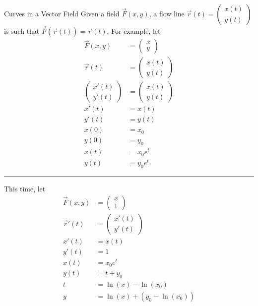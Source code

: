 \documentclass[8pt]{extarticle}
\begin{document}
  \begin{problem}{Curves in a Vector Field}
    Given a field $\vec{F}(x,y)$, a flow line $\vec{r}(t) = \begin{pmatrix}x(t)\\y(t)\end{pmatrix}$ is such that $\vec{F}(\vec{r}(t)) = \vec{r}(t)$. For example, let
    \begin{align*}
      \vec{F}(x,y) &= \begin{pmatrix}x\\y\end{pmatrix}\\
      \vec{r}(t) &= \begin{pmatrix}x(t)\\y(t)\end{pmatrix}\\
      \begin{pmatrix}x'(t) \\ y'(t)\end{pmatrix} &= \begin{pmatrix}x(t)\\y(t)\end{pmatrix}\\
      x'(t) &= x(t)\\
      y'(t) &= y(t)\\
      x(0) &= x_0\\
      y(0) &= y_0\\
      x(t) &= x_0e^{t}\\
      y(t) &= y_0e^{t}.
    \end{align*}
    \vspace{4pt}
    \rule{\textwidth}{0.4pt}
    \vspace{4pt}
    This time, let
    \begin{align*}
      \vec{F}(x,y) &= \begin{pmatrix}x\\1\end{pmatrix}\\
      \vec{r}'(t) &= \begin{pmatrix}x'(t)\\y'(t)\end{pmatrix}\\
      x'(t) &= x(t)\\
      y'(t) &= 1\\
      x(t) &= x_0e^t\\
      y(t) &= t + y_0\\
      t &= \ln(x) - \ln(x_0) \tag*{$x\neq 0$}\\
      y &= \ln(x) + (y_0 - \ln(x_0))
    \end{align*}
  \end{problem}
\end{document}
